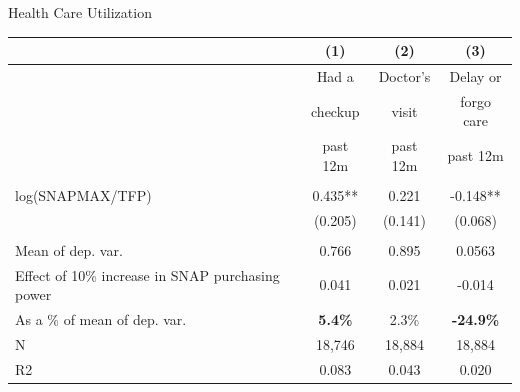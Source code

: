\documentclass{beamer}
\begin{document}
\begin{frame}
\begin{table}{Health Care Utilization}%

\begin{adjustbox}{max width=\textwidth}
  \centering
      \begin{tabular}{lccc}
    
       \toprule
          & (1)   & (2)   & (3) \\
    \midrule
          & Had a & Doctor's & Delay or \\
          & checkup & visit & forgo care \\
          & past 12m & past 12m & past 12m \\
          &       &       &  \\
    log(SNAPMAX/TFP) & 0.435** & 0.221 & -0.148** \\
          & (0.205) & (0.141) & (0.068) \\
          &       &       &  \\
    Mean of dep. var. & 0.766 & 0.895 & 0.0563 \\
    Effect of 10\% increase in SNAP purchasing power & 0.041 & 0.021 & -0.014 \\
    As a \% of mean of dep. var. & \textbf{5.4\%} & 2.3\% & \textbf{-24.9\%} \\
    N     & 18,746 & 18,884 & 18,884 \\
    R2    & 0.083 & 0.043 & 0.020 \\
    \bottomrule
\end{tabular}
\end{adjustbox}
\end{table}
\end{frame}
\end{document}

